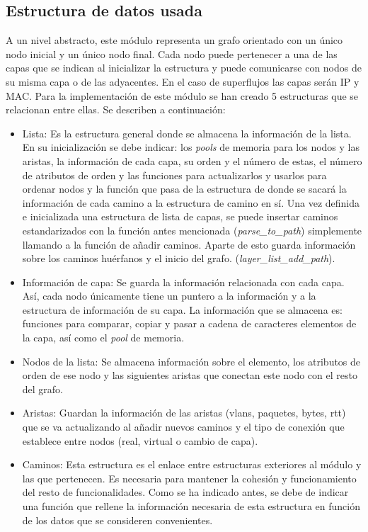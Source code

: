 \documentclass[twoside, 12pt]{epstfg}
\begin{document}
\subsection{Estructura de datos usada}
A un nivel abstracto, este módulo representa un grafo orientado con un único nodo inicial y un único nodo final. Cada nodo puede pertenecer a una de las capas que se indican al inicializar la estructura y puede comunicarse con nodos de su misma capa o de las adyacentes. En el caso de superflujos las capas serán IP y MAC. Para la implementación de este módulo se han creado 5 estructuras que se relacionan entre ellas. Se describen a continuación:

\begin{itemize}
    \item Lista: Es la estructura general donde se almacena la información de la lista. En su inicialización se debe indicar: los \textit{pools} de memoria para los nodos y las aristas, la información de cada capa, su orden y el número de estas, el número de atributos de orden y las funciones para actualizarlos y usarlos para ordenar nodos y la función que pasa de la estructura de donde se sacará la información de cada camino a la estructura de camino en sí. Una vez definida e inicializada una estructura de lista de capas, se puede insertar caminos estandarizados con la función antes mencionada (\textit{parse\_to\_path}) simplemente llamando a la función de añadir caminos.
    Aparte de esto guarda información sobre los caminos huérfanos y el inicio del grafo.
    (\textit{layer\_list\_add\_path}).
    \item Información de capa: Se guarda la información relacionada con cada capa. Así, cada nodo únicamente tiene un puntero a la información y a la estructura de información de su capa. La información que se almacena es: funciones para comparar, copiar y pasar a cadena de caracteres elementos de la capa, así como el \textit{pool} de memoria.
    \item Nodos de la lista: Se almacena información sobre el elemento, los atributos de orden de ese nodo y las siguientes aristas que conectan este nodo con el resto del grafo.
    \item Aristas: Guardan la información de las aristas (vlans, paquetes, bytes, rtt) que se va actualizando al añadir nuevos caminos y el tipo de conexión que establece entre nodos (real, virtual o cambio de capa).
    \item Caminos: Esta estructura es el enlace entre estructuras exteriores al módulo y las que pertenecen. Es necesaria para mantener la cohesión y funcionamiento del resto de funcionalidades. Como se ha indicado antes, se debe de indicar una función que rellene la información necesaria de esta estructura en función de los datos que se consideren convenientes.
\end{itemize}
\end{document}
